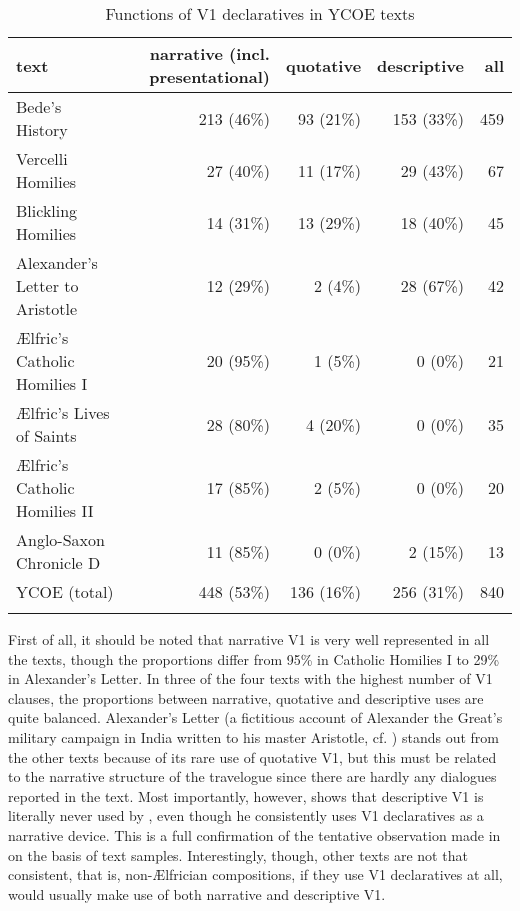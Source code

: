 \documentclass[output=paper,colorlinks,citecolor=brown]{langscibook}
\begin{document}
\begin{table}
\begin{tabularx}{\textwidth}{Xrrrr}
\lsptoprule
{text} & \multicolumn{1}{Q}{narrative (incl. presentational)} & {quotative} & {descriptive} & {all}\\
\midrule
{Bede's History}  & {213 (46\%)} & {93 (21\%)} & {153 (33\%)} & {459}\\
{Vercelli Homilies} & {27 (40\%)} & {11 (17\%)} & {29 (43\%)} & {67}\\
{Blickling Homilies} & {14 (31\%)} & {13 (29\%)} & {18 (40\%)} & {45}\\
{Alexander's Letter to Aristotle} & {12 (29\%)} & {2 (4\%)} & {28 (67\%)} & {42}\\
{Ælfric's Catholic Homilies I}  & {20 (95\%)} & {1 (5\%)} & {0 (0\%)} & {21}\\
{Ælfric's Lives of Saints}  & {28 (80\%)} & {4 (20\%)} & {0 (0\%)} & {35}\\
{Ælfric's Catholic Homilies II}  & {17 (85\%)} & {2 (5\%)} & {0 (0\%)} & {20}\\
{Anglo-Saxon Chronicle D} & {11 (85\%)} & {0 (0\%)} & {2 (15\%)} & {13}\\
\midrule
{YCOE (total)} & {448 (53\%)} & {136 (16\%)} & {256 (31\%)} & {840}\\
\lspbottomrule
\end{tabularx}
\caption{Functions of V1 declaratives in YCOE texts}
\label{tab:cichosz:2}
\end{table}

First of all, it should be noted that narrative V1 is very well represented in all the texts, though the proportions differ from 95\% in Catholic Homilies I to 29\% in Alexander's Letter. In three of the four texts with the highest number of V1 clauses, the proportions between narrative, quotative and descriptive uses are quite balanced. Alexander's Letter (a fictitious account of Alexander the Great's military campaign in India written to his master Aristotle, cf. \citealt{Khalaf2013}) stands out from the other texts because of its rare use of quotative V1, but this must be related to the narrative structure of the travelogue since there are hardly any dialogues reported in the text. Most importantly, however,  shows that descriptive V1 is literally never used by , even though he consistently uses V1 declaratives as a narrative device. This is a full confirmation of the tentative observation made in \citet{Cichosz2022} on the basis of text samples. Interestingly, though, other texts are not that consistent, that is, non-Ælfrician compositions, if they use V1 declaratives at all, would usually make use of both narrative and descriptive V1. 
\end{document}
